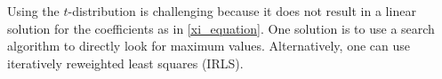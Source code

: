 \documentclass{ametsoc}
\begin{document}



\appendix[B]
\label{appendixB:irls}

Using the $t$-distribution is challenging because it does not result in a linear solution for the coefficients as in \eqref{xi_equation}. One solution is to use a search algorithm to directly look for maximum values. Alternatively, one can use iteratively reweighted least squares (IRLS).
\end{document}
